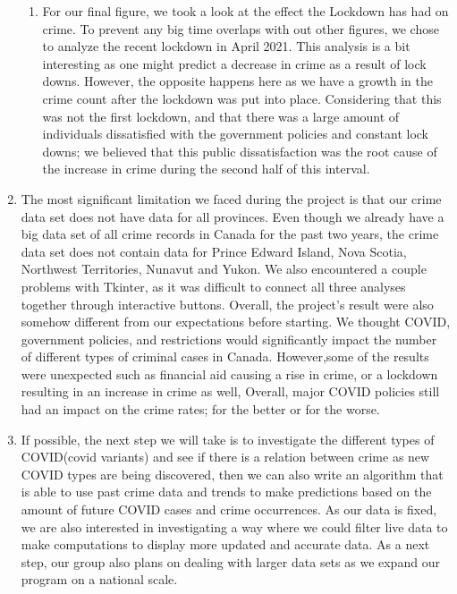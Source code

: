 \documentclass[fontsize=11pt]{article}
\begin{document}
\begin{enumerate}
\begin{enumerate}
\item For our final figure, we took a look at the effect the Lockdown has had on crime. To prevent any big time overlaps with out other figures, we chose to analyze the recent lockdown in April 2021. This analysis is a bit interesting as one might predict a decrease in crime as a result of lock downs. However, the opposite happens here as we have a growth in the crime count after the lockdown was put into place. Considering that this was not the first lockdown, and that there was a large amount of individuals dissatisfied with the government policies and constant lock downs; we believed that this public dissatisfaction was the root cause of the increase in crime during the second half of this interval.
\end{enumerate}

\item The most significant limitation we faced during the project is that our crime data set does not have data for all provinces. Even though we already have a big data set of all crime records in Canada for the past two years, the crime data set does not contain data for Prince Edward Island, Nova Scotia, Northwest Territories, Nunavut and Yukon. We also encountered a couple problems with Tkinter, as it was difficult to connect all three analyses together through interactive buttons. Overall, the project's result were also somehow different from our expectations before starting. We thought COVID, government policies, and restrictions would significantly impact the number of different types of criminal cases in Canada. However,some of the results were unexpected such as financial aid causing a rise in crime, or a lockdown resulting in an increase in crime as well, Overall, major COVID policies still had an impact on the crime rates; for the better or for the worse. 

\item If possible, the next step we will take is to investigate the different types of COVID(covid variants) and see if there is a relation between crime as new COVID types are being discovered, then we can also write an algorithm that is able to use past crime data and trends to make predictions based on the amount of future COVID cases and crime occurrences. As our data is fixed, we are also interested in investigating a way where we could filter live data to make computations to display more updated and accurate data. As a next step, our group also plans on dealing with larger data sets as we expand our program on a national scale. \end{enumerate}
\end{document}
